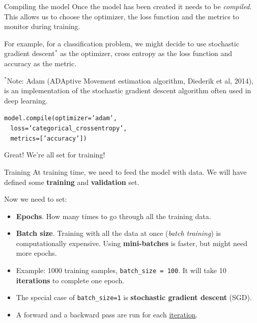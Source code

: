\documentclass[9pt, aspectratio=169]{beamer}
\begin{document}
\begin{frame}
    {Compiling the model}
    Once the model has been created it needs to be \textit{compiled}. This allows us to choose the optimizer, the loss function and the metrics to monitor during training.

    For example, for a classification problem, we might decide to use stochastic gradient descent$^*$ as the optimizer, cross entropy as the loss function and accuracy as the metric.

    \footnotesize
    $^*$Note: Adam (ADAptive Movement estimation algorithm, Diederik et al, 2014), is an implementation of the stochastic gradient descent algorithm often used in deep learning.

    \vspace{2em}
    \begin{codebox}
        \texttt{model.compile(optimizer='adam',\\
        $~~~~$loss='categorical\_crossentropy',\\
        $~~~~$metrics=['accuracy'])}
    \end{codebox}

    \normalsize
    Great! We're all set for training!
\end{frame}

\begin{frame}
    {Training}
    At training time, we need to feed the model with data.
    We will have defined some \textbf{training} and \textbf{validation} set.

    Now we need to set:
    \begin{itemize}[<+->]
        \item \textbf{Epochs}. How many times to go through all the training data.
        \item \textbf{Batch size}. Training with all the data at once (\textit{batch training}) is computationally expensive. Using \textbf{mini-batches} is faster, but might need more epochs.
        \item Example: 1000 training samples, \texttt{batch\_size = 100}. It will take 10 \textbf{iterations} to complete one epoch.
        \item The special case of \texttt{batch\_size=1} is \textbf{stochastic gradient descent} (SGD).
        \item A forward and a backward pass are  run for each \underline{iteration}.
    \end{itemize}

\end{frame}
\end{document}
